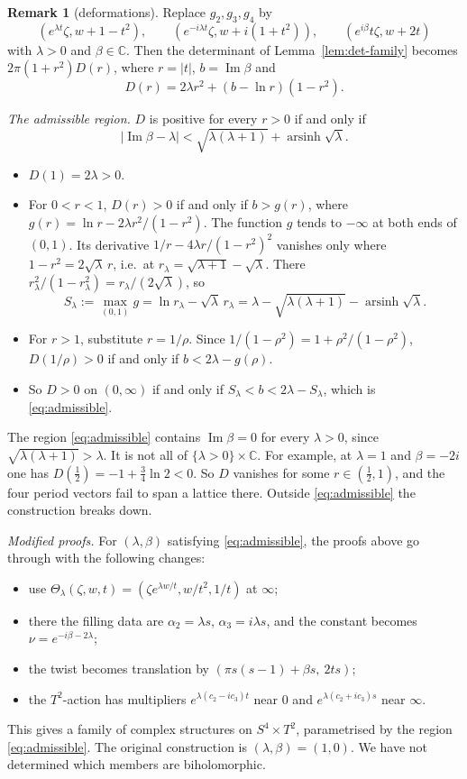 \documentclass{article}
\theoremstyle{definition}
\newtheorem{remark}[theorem]{Remark}
\theoremstyle{plain}
\newcommand{\C}{\mathbb{C}}
\DeclareMathOperator{\Ima}{Im}
\begin{document}
\begin{remark}[deformations]\label{rem:deform}
Replace $g_2,g_3,g_4$ by
\[(e^{\lambda t}\zeta,w+1-t^2),\qquad(e^{-i\lambda t}\zeta,w+i(1+t^2)),\qquad
(e^{i\beta}t\zeta,w+2t)\]
with $\lambda>0$ and $\beta\in\C$. Then the determinant of Lemma~\ref{lem:det-family}
becomes $2\pi(1+r^2)D(r)$, where $r=|t|$, $b=\Ima\beta$ and
\[D(r)=2\lambda r^2+(b-\ln r)(1-r^2).\]

\emph{The admissible region.} $D$ is positive for every $r>0$ if and only if
\begin{equation}\label{eq:admissible}
|\Ima\beta-\lambda|<\sqrt{\lambda(\lambda+1)}+\operatorname{arsinh}\sqrt\lambda.
\end{equation}
\begin{itemize}
\item $D(1)=2\lambda>0$.
\item For $0<r<1$, $D(r)>0$ if and only if $b>g(r)$, where
  $g(r)=\ln r-2\lambda r^2/(1-r^2)$. The function $g$ tends to $-\infty$ at both ends
  of $(0,1)$. Its derivative $1/r-4\lambda r/(1-r^2)^2$ vanishes only where
  $1-r^2=2\sqrt\lambda\,r$, i.e.\ at $r_\lambda=\sqrt{\lambda+1}-\sqrt\lambda$. There
  $r_\lambda^2/(1-r_\lambda^2)=r_\lambda/(2\sqrt\lambda)$, so
  \[S_\lambda:=\max_{(0,1)}g=\ln r_\lambda-\sqrt\lambda\,r_\lambda
  =\lambda-\sqrt{\lambda(\lambda+1)}-\operatorname{arsinh}\sqrt\lambda.\]
\item For $r>1$, substitute $r=1/\rho$. Since $1/(1-\rho^2)=1+\rho^2/(1-\rho^2)$,
  $D(1/\rho)>0$ if and only if $b<2\lambda-g(\rho)$.
\item So $D>0$ on $(0,\infty)$ if and only if $S_\lambda<b<2\lambda-S_\lambda$, which is
  \eqref{eq:admissible}.
\end{itemize}
The region \eqref{eq:admissible} contains $\Ima\beta=0$ for every $\lambda>0$, since
$\sqrt{\lambda(\lambda+1)}>\lambda$. It is not all of $\{\lambda>0\}\times\C$. For
example, at $\lambda=1$ and $\beta=-2i$ one has $D(\tfrac12)=-1+\tfrac34\ln2<0$. So
$D$ vanishes for some $r\in(\tfrac12,1)$, and the four period vectors fail to span a
lattice there. Outside \eqref{eq:admissible} the construction breaks down.

\emph{Modified proofs.} For $(\lambda,\beta)$ satisfying \eqref{eq:admissible}, the
proofs above go through with the following changes:
\begin{itemize}
\item use $\Theta_\lambda(\zeta,w,t)=(\zeta e^{\lambda w/t},w/t^2,1/t)$ at $\infty$;
\item there the filling data are $\alpha_2=\lambda s$, $\alpha_3=i\lambda s$, and the
  constant becomes $\nu=e^{-i\beta-2\lambda}$;
\item the twist becomes translation by $(\pi s(s-1)+\beta s,\ 2ts)$;
\item the $T^2$-action has multipliers $e^{\lambda(c_2-ic_3)t}$ near $0$ and
  $e^{\lambda(c_2+ic_3)s}$ near $\infty$.
\end{itemize}
This gives a family of complex structures on $S^4\times T^2$, parametrised by the
region \eqref{eq:admissible}. The original construction is $(\lambda,\beta)=(1,0)$. We
have not determined which members are biholomorphic.
\end{remark}
\end{document}
